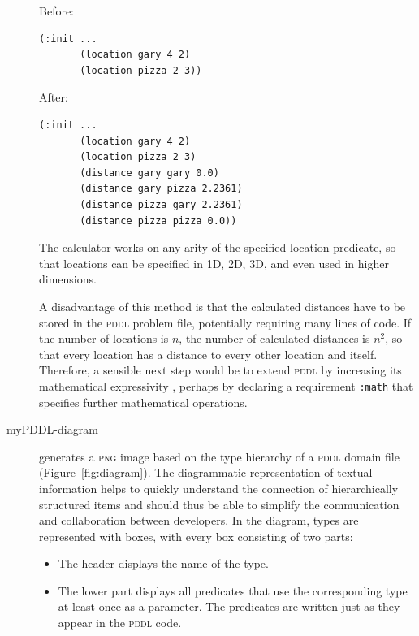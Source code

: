 \documentclass[runningheads]{llncs}
\newcommand{\pddl}{\textsc{pddl}\xspace}
\begin{document}
\begin{description}
  Before:
\begin{verbatim}
(:init ...
       (location gary 4 2)
       (location pizza 2 3))
     \end{verbatim}
     After:
\begin{verbatim}
(:init ...
       (location gary 4 2)
       (location pizza 2 3)
       (distance gary gary 0.0)
       (distance gary pizza 2.2361)
       (distance pizza gary 2.2361)
       (distance pizza pizza 0.0))
\end{verbatim}

The calculator works on any arity of the specified location predicate,
so that locations can be specified in 1D, 2D, 3D, and even used in
higher dimensions.

A disadvantage of this method is that the calculated distances have to
be stored in the \pddl problem file, potentially requiring many lines
of code. If the number of locations is \(n\), the number of calculated
distances is \(n^2\), so that every location has a distance to every
other location and itself. Therefore, a sensible next step would be
to extend \pddl by increasing its mathematical expressivity
\cite{parkinson2012increasing}, perhaps by declaring a requirement
\texttt{:math} that specifies further mathematical operations.


\item[myPDDL-diagram] generates a \textsc{png} image based on the type
  hierarchy of a \pddl domain file (Figure~\ref{fig:diagram}). The
  diagrammatic representation of textual information helps to quickly
  understand the connection of hierarchically structured items and
  should thus be able to simplify the communication and collaboration
  between developers. In the diagram, types are represented with
  boxes, with every box consisting of two parts:

  \begin{itemize}
    \setlength\itemsep{0.5em}
  \item The header displays the name of the type.
  \item The lower part displays all predicates that use the
    corresponding type at least once as a parameter. The predicates
    are written just as they appear in the \pddl code.
\end{itemize}


\end{description}
\end{document}
